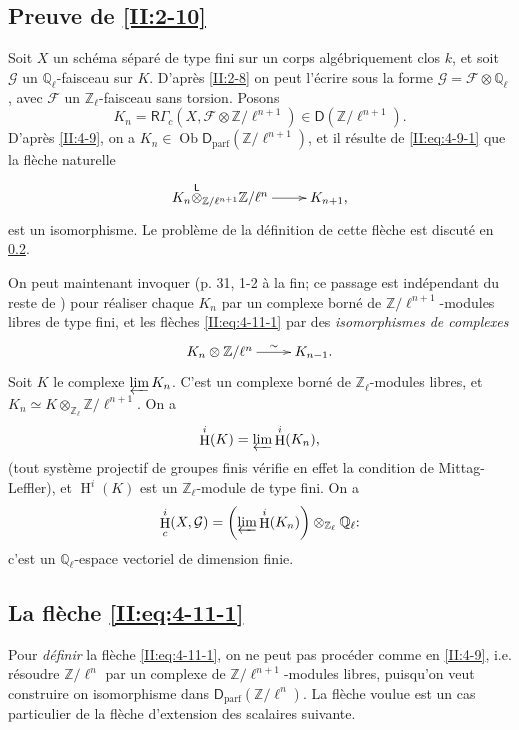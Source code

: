\documentclass{book}
\DeclareMathOperator{\h}{H}
\DeclareMathOperator{\ob}{Ob}
\newcommand{\cF}{\mathcal{F}}
\newcommand{\cG}{\mathcal{G}}
\newcommand{\dQ}{\mathbb{Q}}
\newcommand{\dZ}{\mathbb{Z}}
\newcommand{\R}{\mathsf{R}}
\newcommand{\D}{\mathsf{D}}
\newcommand{\lotimes}{{\overset{\mathsf{L}}{\otimes}}}
\begin{document}
\subsection{Preuve de \texorpdfstring{\ref{II:2-10}}{2.10}}\label{II:4-11}

Soit $X$ un sch\'ema s\'epar\'e de type fini sur un corps alg\'ebriquement clos 
$k$, et soit $\cG$ un $\dQ_\ell$-faisceau sur $K$. D'apr\`es \ref{II:2-8} on 
peut l'\'ecrire sous la forme $\cG=\cF\otimes\dQ_\ell$, avec $\cF$ un 
$\dZ_\ell$-faisceau sans torsion. Posons 
\[
  K_n = \R \Gamma_c(X,\cF\otimes\dZ/\ell^{n+1})\in\D(\dZ/\ell^{n+1}) \text{.}
\]
D'apr\`es \ref{II:4-9}, on a $K_n\in\ob\D_\text{parf}(\dZ/\ell^{n+1})$, et il 
r\'esulte de \eqref{II:eq:4-9-1} que la fl\`eche naturelle 
\begin{equation}\label{II:eq:4-11-1}
\xymatrix{
  K_n\lotimes_{\dZ/\ell^{n+1}} \dZ/\ell^n \ar[r] & K_{n+1} \text{,}
}
\end{equation}
est un isomorphisme. Le probl\`eme de la d\'efinition de cette fl\`eche est 
discut\'e en \ref{II:4-12}. 

On peut maintenant invoquer \cite[XI.3.3]{SGA5} (p. 31, 1-2 \`a la fin; ce 
passage est ind\'ependant du reste de \cite{SGA5}) pour r\'ealiser chaque 
$K_n$ par un complexe born\'e de $\dZ/\ell^{n+1}$-modules libres de type fini, 
et les fl\`eches \eqref{II:eq:4-11-1} par des \emph{isomorphismes de complexes} 
\[\xymatrix{
  K_n\otimes \dZ/\ell^n \ar[r]^-\sim 
    & K_{n-1} \text{.}
}\]
Soit $K$ le complexe $\varprojlim K_n$. C'est un complexe born\'e de 
$\dZ_\ell$-modules libres, et $K_n\simeq K\otimes_{\dZ_\ell}\dZ/\ell^{n+1}$. On 
a 
\[
  \h^i(K) = \varprojlim \h^i(K_n) \text{,}
\]
(tout syst\`eme projectif de groupes finis v\'erifie en effet la condition de 
Mittag-Leffler), et $\h^i(K)$ est un $\dZ_\ell$-module de type fini. On a 
\[
  \h_c^i(X,\cG) = \left(\varprojlim \h^i(K_n) \right)\otimes_{\dZ_\ell} \dQ_\ell \text{:}
\]
c'est un $\dQ_\ell$-espace vectoriel de dimension finie. 





\subsection{La fl\`eche \texorpdfstring{\eqref{II:eq:4-11-1}}{(4.11.1)}}\label{II:4-12}

Pour \emph{d\'efinir} la fl\`eche \eqref{II:eq:4-11-1}, on ne peut pas 
proc\'eder comme en \ref{II:4-9}, i.e. r\'esoudre $\dZ/\ell^n$ par un complexe 
de $\dZ/\ell^{n+1}$-modules libres, puisqu'on veut construire on isomorphisme 
dans $\D_\text{parf}(\dZ/\ell^n)$. La fl\`eche voulue est un cas particulier de 
la fl\`eche d'extension des scalaires suivante. 
\end{document}
